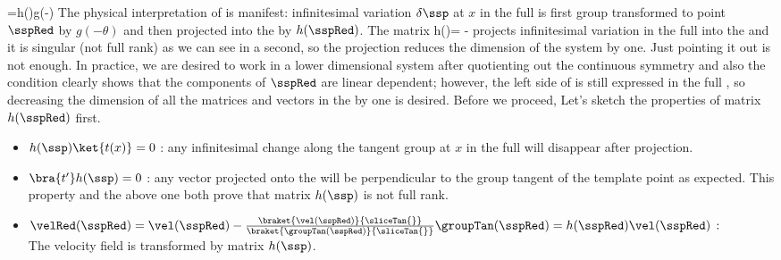     =h(\sspRed)g(-\theta)\ket{\delta \ssp}
\eeq
The physical interpretation of  is manifest:
infinitesimal variation $\delta \ssp$ at $x$ in the full {\statesp} is
 first group transformed to point $\sspRed$ by $g(-\theta)$ and then
projected into the {\slice} by $h(\sspRed)$.
The matrix
\beq
h(\sspRed)=
    \matId-\frac{\ket{\groupTan(\sspRed)}\bra{\sliceTan{}}}
    {\braket{\groupTan(\sspRed)}{\sliceTan{}}}
projects infinitesimal variation in the full {\statesp} into the {\slice}
and it is singular (not full rank) as we can see in a second, so the projection reduces the dimension of the system by one.
Just pointing it out is not enough.  In practice,
we are desired to work in a lower dimensional system after quotienting out
the continuous symmetry and also the
{\slice} condition 
clearly shows that the components of $\sspRed$ are linear dependent;
however, the left side of  is still expressed in
the full {\statesp}, so decreasing the dimension of all the matrices and
vectors in the {\slice} by one is desired. Before we proceed,
Let's sketch the properties of matrix $h(\sspRed)$ first.
\begin{itemize}
\item $h(\ssp)\ket{t(x)}=0$ : any infinitesimal change along the tangent group
 at $x$
in the full {\statesp} will disappear after projection.
\item $\bra{t'}h(\ssp)=0$ : any vector projected onto the {\slice} will be
perpendicular to the group tangent of the template point as expected. This
property and the above one both prove that matrix $h(\ssp)$ is not full rank.
\item
$
\velRed(\sspRed)=\vel(\sspRed)
-\frac{\braket{\vel(\sspRed)}{\sliceTan{}}}{\braket{\groupTan(\sspRed)}{\sliceTan{}}}
\groupTan(\sspRed)=h(\sspRed)\vel(\sspRed)
\,:
$
\\
The velocity field is transformed by matrix $h(\ssp)$.
\end{itemize}

